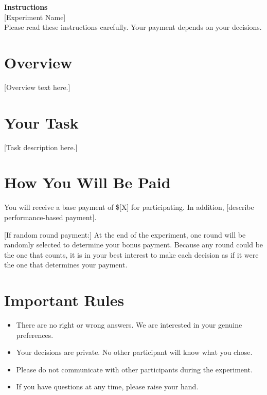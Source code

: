 \documentclass[12pt]{article}
\begin{document}
\begin{center}
{\Large \textbf{Instructions}} \\[0.5em]
{\normalsize [Experiment Name]} \\[0.5em]
{\small Please read these instructions carefully. Your payment depends on your decisions.}
\end{center}

\bigskip

\section*{Overview}


[Overview text here.]

\section*{Your Task}


[Task description here.]

\section*{How You Will Be Paid}


You will receive a base payment of \$[X] for participating. In addition, [describe performance-based payment].

[If random round payment:] At the end of the experiment, one round will be randomly selected to determine your bonus payment. Because any round could be the one that counts, it is in your best interest to make each decision as if it were the one that determines your payment.

\section*{Important Rules}

\begin{itemize}[nosep]
    \item There are no right or wrong answers. We are interested in your genuine preferences.
    \item Your decisions are private. No other participant will know what you chose.
    \item Please do not communicate with other participants during the experiment.
    \item If you have questions at any time, please raise your hand. %
\end{itemize}
\end{document}
